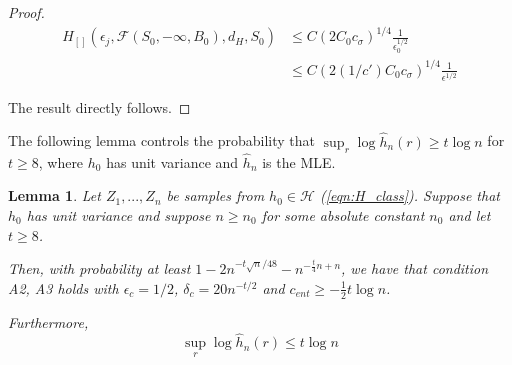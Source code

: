 \documentclass[12pt]{article}
\newtheorem{lemma}[theorem]{Lemma}
\begin{document}
\begin{proof}
  \begin{align*}
    H_{[]}(\epsilon_j, \mathcal{F}(S_0, -\infty, B_0), d_H, S_0) &\leq
                                                                   C (2 C_0 c_\sigma)^{1/4}  \frac{1}{\epsilon_0^{1/2}} \\
     &\leq      C (2 (1/c') C_0 c_\sigma)^{1/4}  \frac{1}{\epsilon^{1/2}}
  \end{align*}

  The result directly follows. 
\end{proof}


The following lemma controls the probability that $\sup_r \log \hat{h}_n(r) \geq t \log n$ for $t \geq 8$, where $h_0$ has unit variance and $\hat{h}_n$ is the MLE. 

\begin{lemma}
  \label{Lem:ExtremeEventControl}
  Let $Z_1, ..., Z_n$ be samples from $h_0 \in \mathcal{H}$ (\ref{eqn:H_class}). Suppose that $h_0$ has unit variance and suppose $n \geq n_0$ for some absolute constant $n_0$ and let $t \geq 8$.
  
  Then, with probability at least
   $1 - 2n^{-t \sqrt{n}/48} - n^{- \frac{t}{4} n + n}$,
  we have that condition A2, A3 holds with $\epsilon_c = 1/2$, $\delta_c = 20 n^{-t/2}$ and $c_{ent} \geq - \frac{1}{2} t \log n$.

  Furthermore,
  \[
    \sup_r \log \hat{h}_n(r) \leq t\log n
  \]
  
\end{lemma}
\end{document}
